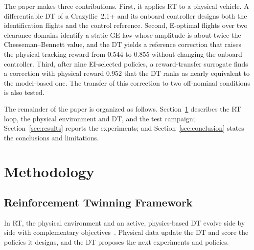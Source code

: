 \documentclass[journal]{IEEEtran}
\begin{document}
The paper makes three contributions. First, it applies RT to a physical vehicle. A differentiable DT of a Crazyflie~2.1+ and its onboard controller designs both the identification flights and the control reference. Second, E-optimal flights over two clearance domains identify a static GE law whose amplitude is about twice the Cheeseman--Bennett value, and the DT yields a reference correction that raises the physical tracking reward from $0.544$ to $0.855$ without changing the onboard controller. Third, after nine EI-selected policies, a reward-transfer surrogate finds a correction with physical reward $0.952$ that the DT ranks as nearly equivalent to the model-based one. The transfer of this correction to two off-nominal conditions is also tested.

The remainder of the paper is organized as follows. Section~\ref{sec:methodology} describes the RT loop, the physical environment and DT, and the test campaign; Section~\ref{sec:results} reports the experiments; and Section~\ref{sec:conclusion} states the conclusions and limitations.

\section{Methodology}\label{sec:methodology}


\subsection{Reinforcement Twinning Framework}
\label{sec:rt-framework}

In RT, the physical environment and an active, physics-based DT evolve side by side with complementary objectives~\cite{SchenaRT2023,Mendez2026}. Physical data update the DT and score the policies it designs, and the DT proposes the next experiments and policies.
\end{document}
